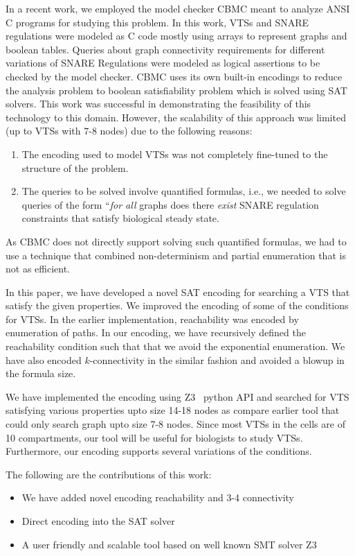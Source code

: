 In a recent work, we employed the model checker CBMC \cite{CKY03,
ckl2004} meant to analyze ANSI C programs for studying this problem.
%
In this work, VTSs and SNARE regulations were modeled as C code mostly
using arrays to represent graphs and boolean tables.
%
Queries about graph connectivity requirements for different variations
of SNARE Regulations were modeled as logical assertions to be checked
by the model checker.
%
CBMC uses its own built-in encodings to reduce the analysis problem to
boolean satisfiability problem which is solved using SAT solvers.
%
This work was successful in demonstrating the feasibility of this
technology to this domain.
%
However, the scalability of this approach was limited (up to VTSs
with 7-8 nodes) due to the following reasons:
\begin{enumerate}
\item The encoding used to model VTSs was not completely fine-tuned
to the structure of the problem.
\item The queries to be solved involve quantified formulas, i.e., we
needed to solve queries of the form ``\emph{for all} graphs does there
\emph{exist} SNARE regulation constraints that satisfy biological
steady state.
\end{enumerate} As CBMC does not directly support solving such
quantified formulas, we had to use a technique that combined
non-determinism and partial enumeration that is not as
efficient.\newline

%
In this paper, we have developed a novel SAT encoding for
searching a VTS that satisfy the given properties.
%
We improved the encoding of some of the conditions for VTSs.
%
In the earlier implementation, reachability was encoded by
enumeration of paths.
%
In our encoding, we have recursively defined the reachability condition
such that that we avoid the exponential enumeration.
%
We have also encoded $k$-connectivity in the similar fashion and
avoided a blowup in the formula size.
%

We have implemented the encoding using Z3~\cite{z3} python API and searched for
VTS satisfying various properties upto size 14-18 nodes as compare
earlier tool that could only search graph upto size 7-8 nodes.
%
Since most VTSs in the cells are of 10 compartments,
our tool will be useful for biologists to study VTSs.
%
Furthermore, our encoding supports several variations of
the conditions.\newline

The following are the contributions of this work:
\begin{itemize}
\item We have added novel encoding reachability and 3-4 connectivity
\item Direct encoding into the SAT solver
\item A user friendly and scalable tool based on well known SMT solver Z3
\end{itemize}


